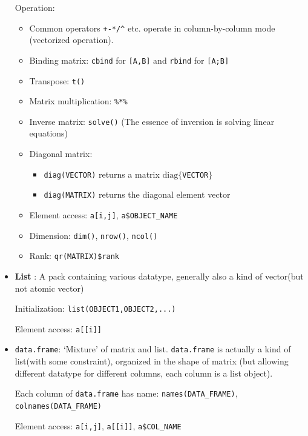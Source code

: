 \begin{itemize}[topsep=2pt,itemsep=0pt]
    Operation:
    \begin{itemize}[topsep=2pt,itemsep=0pt]
        \item Common operators \lstinline|+-*/^| etc. operate in column-by-column mode (vectorized operation).
        \item Binding matrix: \lstinline|cbind| for \lstinline|[A,B]| and \lstinline|rbind| for \lstinline|[A;B]|
        \item Transpose: \lstinline|t()|
        \item Matrix multiplication: \lstinline|%*%|
        \item Inverse matrix: \lstinline|solve()| (The essence of inversion is solving linear equations)
        \item Diagonal matrix:
        \begin{itemize}[topsep=2pt,itemsep=0pt]
            \item \lstinline|diag(VECTOR)| returns a matrix $ \mathrm{diag}\{ $\lstinline|VECTOR|$ \} $
            \item \lstinline|diag(MATRIX)| returns the diagonal element vector
        \end{itemize}
        \item Element access: \lstinline|a[i,j]|, \lstinline|a$OBJECT_NAME|
        \item Dimension: \lstinline|dim()|, \lstinline|nrow()|, \lstinline|ncol()|
        \item Rank: \lstinline|qr(MATRIX)$rank|
    \end{itemize}
    
    \item \textbf{List} : A pack containing various datatype, generally also a kind of vector(but not atomic vector)
    
    Initialization: \lstinline|list(OBJECT1,OBJECT2,...)|

    Element access: \lstinline|a[[i]]|
    \item \lstinline|data.frame|: `Mixture' of matrix and list. \lstinline|data.frame| is actually a kind of list(with some constraint), organized in the shape of matrix (but allowing different datatype for different columns, each column is a list object).
    
    Each column of \lstinline|data.frame| has name: \lstinline|names(DATA_FRAME)|, \lstinline|colnames(DATA_FRAME)|

    Element access: \lstinline|a[i,j]|, \lstinline|a[[i]]|, \lstinline|a$COL_NAME|
\end{itemize}

